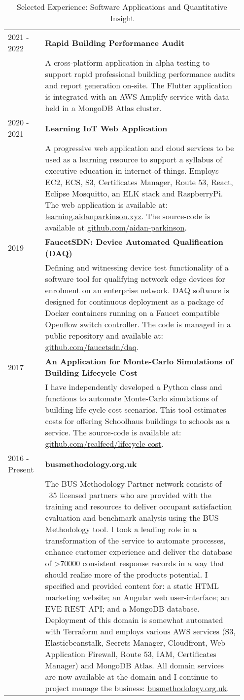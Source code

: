 \documentclass[11pt, oneside]{article}   	%
\begin{document}
\begin{table}[h]
\caption*{Selected Experience: Software Applications and Quantitative Insight}
\vspace{-5mm}
\small
\begin{center}
\begin{tabular}{p{0.15\linewidth} p{0.8\linewidth}}
\hline
2021 - 2022 &\textbf{Rapid Building Performance Audit} \\
&A cross-platform application in alpha testing to support rapid professional building performance audits and report generation on-site. The Flutter application is integrated with an AWS Amplify service with data held in a MongoDB Atlas cluster. \\
2020 - 2021 &\textbf{Learning IoT Web Application} \\
&A progressive web application and cloud services to be used as a learning resource to support a syllabus of executive education in internet-of-things. Employs EC2, ECS, S3, Certificates Manager, Route 53, React, Eclipse Mosquitto, an ELK stack and RaspberryPi. The web application is available at: \url{learning.aidanparkinson.xyz}. The source-code is available at \url{github.com/aidan-parkinson}. \\
2019&\textbf{FaucetSDN: Device Automated Qualification (DAQ)} \\
&Defining and witnessing device test functionality of a software tool for qualifying network edge devices for enrolment on an enterprise network. DAQ software is designed for continuous deployment as a package of Docker containers running on a Faucet compatible Openflow switch controller. The code is managed in a public repository and available at: \url{github.com/faucetsdn/daq}. \\
2017&\textbf{An Application for Monte-Carlo Simulations of Building Lifecycle Cost} \\
&I have independently developed a Python class and functions to automate Monte-Carlo simulations of building life-cycle cost scenarios. This tool estimates costs for offering Schoolhaus buildings to schools as a service. The source-code is available at: \url{github.com/realfeed/lifecycle-cost}. \\
2016 - Present&\textbf{busmethodology.org.uk} \\
&The BUS Methodology Partner network consists of ~35 licensed partners who are provided with the training and resources to deliver occupant satisfaction evaluation and benchmark analysis using the BUS Methodology tool. I took a leading role in a transformation of the service to automate processes, enhance customer experience and deliver the database of >70000 consistent response records in a way that should realise more of the products potential. I specified and provided content for: a static HTML marketing website; an Angular web user-interface; an EVE REST API; and a MongoDB database. Deployment of this domain is somewhat automated with Terraform and employs various AWS services (S3, Elasticbeanstalk, Secrets Manager, Cloudfront, Web Application Firewall, Route 53, IAM, Certificates Manager) and MongoDB Atlas. All domain services are now available at the domain and I continue to project manage the business: \url{busmethodology.org.uk}. \\

\end{tabular}
\end{center}
\end{table}
\end{document}
